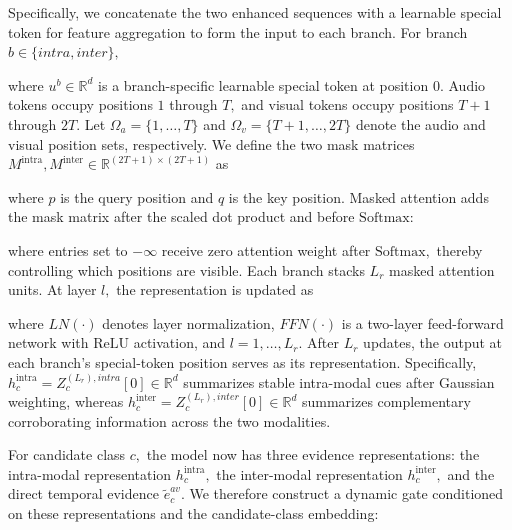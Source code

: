 Specifically, we concatenate the two enhanced sequences with a learnable special token for feature aggregation to form the input to each branch. For branch $b\in \{intra,inter\},$


\noindent\unskip where ${u}^{b}\in {\mathbb{R}}^{d}$ is a branch-specific learnable special token at position $0.$ Audio tokens occupy positions $1$ through $T,$ and visual tokens occupy positions $T+1$ through $2T.$ Let ${\Omega }_{a}=\{1,\ldots ,T\}$ and ${\Omega }_{v}=\{T+1,\ldots ,2T\}$ denote the audio and visual position sets, respectively. We define the two mask matrices ${M}^{\mathrm{intra}},{M}^{\mathrm{inter}}\in {\mathbb{R}}^{(2T+1)\times (2T+1)}$ as




\noindent\unskip where $p$ is the query position and $q$ is the key position. Masked attention adds the mask matrix after the scaled dot product and before $\mathrm{Softmax}:$


\noindent\unskip where entries set to $-\infty $ receive zero attention weight after $\mathrm{Softmax},$ thereby controlling which positions are visible. Each branch stacks ${L}_{r}$ masked attention units. At layer $l,$ the representation is updated as


\noindent\unskip where $LN(\cdot )$ denotes layer normalization, $FFN(\cdot )$ is a two-layer feed-forward network with $\mathrm{ReLU}$ activation, and $l=1,\ldots ,{L}_{r}.$ After ${L}_{r}$ updates, the output at each branch\textquoteright{}s special-token position serves as its representation. Specifically, ${h}_{c}^{\mathrm{intra}}={Z}_{c}^{({L}_{r}),intra}[0]\in {\mathbb{R}}^{d}$ summarizes stable intra-modal cues after Gaussian weighting, whereas ${h}_{c}^{\mathrm{inter}}={Z}_{c}^{({L}_{r}),inter}[0]\in {\mathbb{R}}^{d}$ summarizes complementary corroborating information across the two modalities.

For candidate class $c,$ the model now has three evidence representations: the intra-modal representation ${h}_{c}^{\mathrm{intra}},$ the inter-modal representation ${h}_{c}^{\mathrm{inter}},$ and the direct temporal evidence ${\widetilde{e}}_{c}^{av}.$ We therefore construct a dynamic gate conditioned on these representations and the candidate-class embedding:

